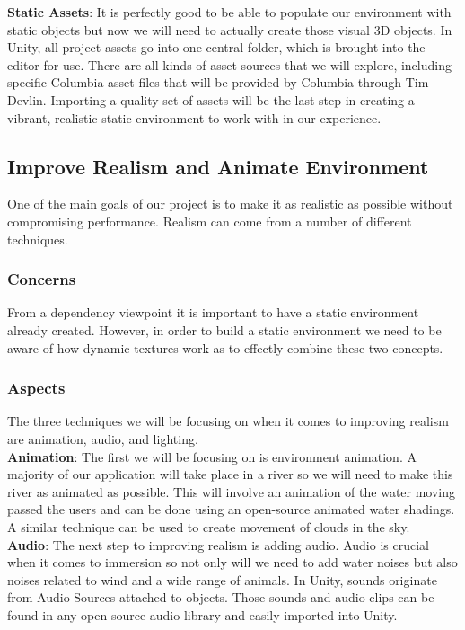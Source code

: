\documentclass[10pt,journal,compsoc,onecolumn, draftclsnofoot]{IEEEtran}
\begin{document}
\hangindent=0.5cm \textbf{Static Assets}: It is perfectly good to be able to populate our environment with static objects but now we will need to actually create those visual 3D objects. In Unity, all project assets go into one central folder, which is brought into the editor for use. \cite{unity_importing_assets} There are all kinds of asset sources that we will explore, including specific Columbia asset files that will be provided by Columbia through Tim Devlin. Importing a quality set of assets will be the last step in creating a vibrant, realistic static environment to work with in our experience.\\

\subsection{Improve Realism and Animate Environment}
One of the main goals of our project is to make it as realistic as possible
without compromising performance. Realism can come from a number of different
techniques.
\subsubsection{Concerns}
From a dependency viewpoint it is important to have a static environment already created. However, in order to build a static environment we need to be aware of how dynamic textures work as to effectly combine these two concepts.

\subsubsection{Aspects}
The three techniques we will be focusing on when it comes to improving realism are animation, audio, and lighting. \\

\hangindent=0.5cm \textbf{Animation}: The first we will be focusing on is environment animation. A majority of our application will take place in a river so we will need to make this river as animated as possible. This will involve an animation of the water moving passed the users and can be done using an open-source animated water shadings. A similar technique can be used to create movement of clouds in the sky.\\

\hangindent=0.5cm \textbf{Audio}: The next step to improving realism is adding audio. Audio is crucial when it comes to immersion so not only will we need to add water noises but also noises related to wind and a wide range of animals. In Unity, sounds originate from Audio Sources attached to objects. Those sounds and audio clips can be found in any open-source audio library and easily imported into Unity. \\
\end{document}
